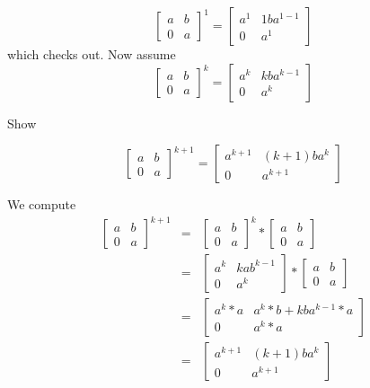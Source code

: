 \documentclass[16 pt]{amsart}
\theoremstyle{definition}
\theoremstyle{remark}
\numberwithin{equation}{subsection}
\begin{document}
\[
\begin{bmatrix}
a & b \\
0 & a
\end{bmatrix}^1 = \begin{bmatrix}
a^1 & 1ba^{1-1}\\
0 & a^1
\end{bmatrix}
\]
which checks out.  Now assume
\[
\begin{bmatrix}
a & b \\
0 & a
\end{bmatrix}^k = \begin{bmatrix}
a^k & kba^{k-1}\\
0 & a^k
\end{bmatrix}
\]

Show

\[
\begin{bmatrix}
a & b \\
0 & a
\end{bmatrix}^{k+1} = \begin{bmatrix}
a^{k+1} & (k+1)ba^{k}\\
0 & a^{k+1}
\end{bmatrix}
\]


We compute
\begin{eqnarray}
\begin{bmatrix}
a & b \\
0 & a
\end{bmatrix}^{k+1} & = & 
\begin{bmatrix}
a & b \\
0 & a
\end{bmatrix}^{k}*
\begin{bmatrix}
a & b \\
0 & a
\end{bmatrix} \nonumber \\
& = & 
\begin{bmatrix}
a^k & kab^{k-1} \\
0 & a^k
\end{bmatrix}*
\begin{bmatrix}
a & b \\
0 & a
\end{bmatrix} \nonumber \\
& = &
\begin{bmatrix}
a^k *a & a^k*b + kba^{k-1}*a \\
0 & a^k * a
\end{bmatrix} \nonumber \\
& = & 
\begin{bmatrix}
a^{k+1} & (k+1)ba^k \\
0 & a^{k+1}
\end{bmatrix} \nonumber
\end{eqnarray}
\end{document}
